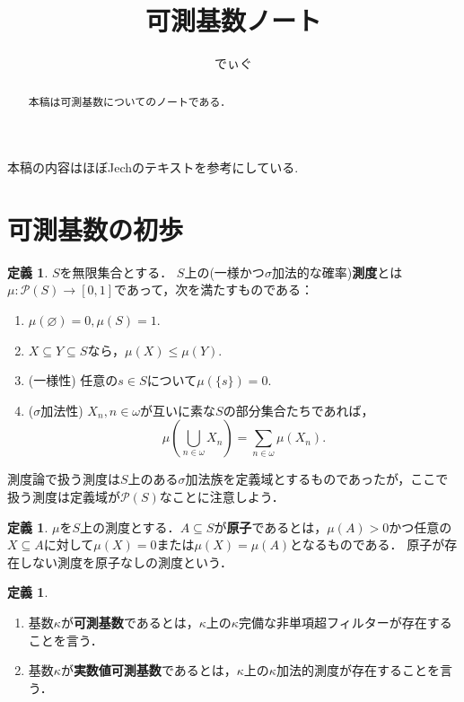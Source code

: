 \documentclass[uplatex]{jsarticle}
\title{可測基数ノート}
\author{でぃぐ}
\newcommand{\Pow}{\mathcal{P}}
\renewcommand\emptyset{\varnothing}
\renewcommand\subset{\subseteq}
\theoremstyle{definition}
\newtheorem{defi}[thm]{定義}
\begin{document}
	
	\maketitle
	
	\begin{abstract}
		本稿は可測基数についてのノートである．
	\end{abstract}
	
	\tableofcontents
	
	\vspace{1cm}
	
	本稿の内容はほぼJechのテキスト\cite{jech2006set}を参考にしている.
	
	\section{可測基数の初歩}
	
	\begin{defi}
		$S$を無限集合とする． $S$上の(一様かつ$\sigma$加法的な確率)\textbf{測度}とは$\mu \colon \Pow(S) \to [0, 1]$であって，次を満たすものである：
		\begin{enumerate}
			\item $\mu(\emptyset) = 0, \mu(S) = 1$.
			\item $X \subset Y \subset S$なら，$\mu(X) \le \mu(Y)$.
			\item (一様性) 任意の$s \in S$について$\mu(\{s\}) = 0$.
			\item ($\sigma$加法性) $X_n, n \in \omega$が互いに素な$S$の部分集合たちであれば，
			\[
			\mu\left(\bigcup_{n \in \omega} X_n\right) = \sum_{n \in \omega} \mu(X_n). 
			\]
		\end{enumerate}
	\end{defi}
	
	測度論で扱う測度は$S$上のある$\sigma$加法族を定義域とするものであったが，ここで扱う測度は定義域が$\Pow(S)$なことに注意しよう．
	
	\begin{defi}
		$\mu$を$S$上の測度とする．$A \subset S$が\textbf{原子}であるとは，$\mu(A) > 0$かつ任意の$X \subset A$に対して$\mu(X) = 0$または$\mu(X) = \mu(A)$となるものである．
		原子が存在しない測度を原子なしの測度という．
	\end{defi}
	
	\begin{defi}
		\begin{enumerate}
			\item 基数$\kappa$が\textbf{可測基数}であるとは，$\kappa$上の$\kappa$完備な非単項超フィルターが存在することを言う．
			\item 基数$\kappa$が\textbf{実数値可測基数}であるとは，$\kappa$上の$\kappa$加法的測度が存在することを言う．
		\end{enumerate}
	\end{defi}
	
\end{document}
